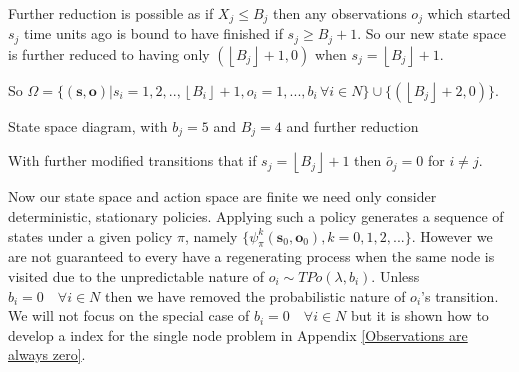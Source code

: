 \documentclass[a4paper,10pt]{article}
\newcommand{\floor}[1]{\left \lfloor #1 \right \rfloor}
\theoremstyle{definition}
\theoremstyle{definition}
\theoremstyle{remark}
\theoremstyle{definition}
\begin{document}
Further reduction is possible as if $X_{j} \leq B_{j}$ then any observations $o_{j}$ which started $s_{j}$ time units ago is bound to have finished if $s_{j} \geq B_{j}+1$. So our new state space is further reduced to having only $(\floor{B_{j}}+1,0)$ when $s_{j}=\floor{B_{j}}+1$.

So $\Omega= \{ (\bm{s},\bm{o}) | s_{i}=1,2,..,\floor{B_{i}}+1 , o_{i}=1,...,b_{i} \, \forall i \in N \} \cup \{(\floor{B_{j}}+2,0) \}$.

\begin{myfigure}
\begin{center}
\end{center}
\caption{State space diagram, with $b_{j}=5$ and $B_{j}=4$ and further reduction}
\end{myfigure}

With further modified transitions that if $s_{j}=\floor{B_{j}}+1$ then $\widetilde{o_{j}}=0$ for $i \neq j$. 

Now our state space and action space are finite we need only consider deterministic, stationary policies. Applying such a policy generates a sequence of states under a given policy $\pi$, namely $\{\psi_{\pi}^{k}(\bm{s}_{0},\bm{o}_{0}), k=0,1,2,... \}$. However we are not guaranteed to every have a regenerating process when the same node is visited due to the unpredictable nature of $o_{i} \sim TPo(\lambda,b_{i})$. Unless $b_{i}=0 \quad \forall i \in N$ then we have removed the probabilistic nature of $o_{i}$'s transition. We will not focus on the special case of $b_{i}=0 \quad \forall i \in N$ but it is shown how to develop a index for the single node problem in Appendix \ref{Observations are always zero}.
\end{document}

